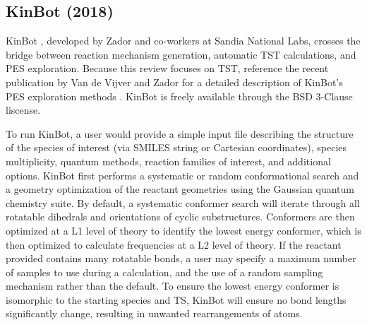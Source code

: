 \documentclass[preprint, 11pt]{elsarticle} %
\begin{document}

\subsection{KinBot (2018)}


KinBot \cite{kinbot:2018, kinbot:2019}, developed by Zador and co-workers at Sandia National Labs, crosses the bridge between reaction mechanism generation, automatic TST calculations, and PES exploration.
Because this review focuses on TST, reference the recent publication by Van de Vijver and Zador for a detailed description of KinBot's PES exploration methods \cite{kinbot:2019}.
KinBot is freely available through the BSD 3-Clause liscense.

To run KinBot, a user would provide a simple input file describing the structure of the species of interest (via SMILES string or Cartesian coordinates), species multiplicity, quantum methods, reaction families of interest, and additional options. 
KinBot first performs a systematic or random conformational search and a geometry optimization of the reactant geometries using the Gaussian quantum chemistry suite.
By default, a systematic conformer search will iterate through all rotatable dihedrals and orientations of cyclic substructures. 
Conformers are then optimized at a L1 level of theory to identify the lowest energy conformer, which is then optimized to calculate frequencies at a L2 level of theory.
If the reactant provided contains many rotatable bonds, a user may specify a maximum number of samples to use during a calculation, and the use of a random sampling mechanism rather than the default.
To ensure the lowest energy conformer is isomorphic to the starting species and TS, KinBot will ensure no bond lengths significantly change, resulting in unwanted rearrangements of atoms.
\end{document}

